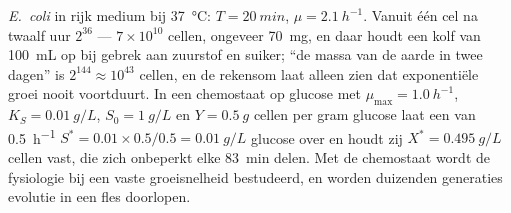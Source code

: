 \begin{example}\label{ex:b3:bacteriology:numbers}
\emph{E.~coli} in rijk medium bij \qty{37}{\celsius}: $T = \qty{20}{min}$,
$\mu = \qty{2.1}{h^{-1}}$. Vanuit één cel na twaalf uur $2^{36}$ ---
$7\times 10^{10}$ cellen, ongeveer \qty{70}{mg}, en daar houdt een kolf
van \qty{100}{mL} op bij gebrek aan zuurstof en suiker; ``de massa van
de aarde in twee dagen'' is $2^{144}\approx 10^{43}$ cellen, en de
rekensom laat alleen zien dat exponentiële groei nooit voortduurt. In
een chemostaat op glucose met $\mu_{\max} = \qty{1.0}{h^{-1}}$, $K_{S} =
\qty{0.01}{g/L}$, $S_{0} = \qty{1}{g/L}$ en $Y = \qty{0.5}{g}$ cellen
per gram glucose laat een  van \qty{0.5}{h^{-1}}
$S^{*}
= 0.01\times 0.5/0.5 = \qty{0.01}{g/L}$ glucose over en houdt zij $X^{*} =
\qty{0.495}{g/L}$ cellen vast, die zich onbeperkt elke \qty{83}{min}
delen. Met de chemostaat wordt de fysiologie bij een
vaste groeisnelheid bestudeerd, en worden duizenden generaties evolutie
in een fles doorlopen.
\end{example}

